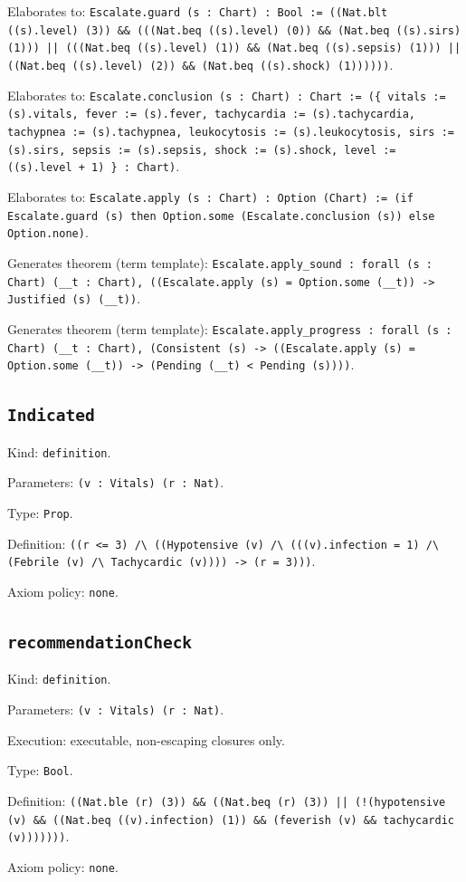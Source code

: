 \documentclass[11pt]{article}
\begin{document}
\noindent Elaborates to: \texttt{Escalate.guard (s : Chart) : Bool := ((Nat.blt ((s).level) (3)) \&\& (((Nat.beq ((s).level) (0)) \&\& (Nat.beq ((s).sirs) (1))) || (((Nat.beq ((s).level) (1)) \&\& (Nat.beq ((s).sepsis) (1))) || ((Nat.beq ((s).level) (2)) \&\& (Nat.beq ((s).shock) (1))))))}.\par
\noindent Elaborates to: \texttt{Escalate.conclusion (s : Chart) : Chart := (\{ vitals := (s).vitals, fever := (s).fever, tachycardia := (s).tachycardia, tachypnea := (s).tachypnea, leukocytosis := (s).leukocytosis, sirs := (s).sirs, sepsis := (s).sepsis, shock := (s).shock, level := ((s).level + 1) \} : Chart)}.\par
\noindent Elaborates to: \texttt{Escalate.apply (s : Chart) : Option (Chart) := (if Escalate.guard (s) then Option.some (Escalate.conclusion (s)) else Option.none)}.\par
\noindent Generates theorem (term template): \texttt{Escalate.apply\_sound : forall (s : Chart) (\_\_t : Chart), ((Escalate.apply (s) = Option.some (\_\_t)) -> Justified (s) (\_\_t))}.\par
\noindent Generates theorem (term template): \texttt{Escalate.apply\_progress : forall (s : Chart) (\_\_t : Chart), (Consistent (s) -> ((Escalate.apply (s) = Option.some (\_\_t)) -> (Pending (\_\_t) < Pending (s))))}.\par
\subsection*{\texttt{Indicated}}
\noindent Kind: \texttt{definition}.\par
\noindent Parameters: \texttt{(v : Vitals) (r : Nat)}.\par
\noindent Type: \texttt{Prop}.\par
\noindent Definition: \texttt{((r <= 3) /\textbackslash{} ((Hypotensive (v) /\textbackslash{} (((v).infection = 1) /\textbackslash{} (Febrile (v) /\textbackslash{} Tachycardic (v)))) -> (r = 3)))}.\par
\noindent Axiom policy: \texttt{none}.\par
\subsection*{\texttt{recommendationCheck}}
\noindent Kind: \texttt{definition}.\par
\noindent Parameters: \texttt{(v : Vitals) (r : Nat)}.\par
\noindent Execution: executable, non-escaping closures only.\par
\noindent Type: \texttt{Bool}.\par
\noindent Definition: \texttt{((Nat.ble (r) (3)) \&\& ((Nat.beq (r) (3)) || (!(hypotensive (v) \&\& ((Nat.beq ((v).infection) (1)) \&\& (feverish (v) \&\& tachycardic (v)))))))}.\par
\noindent Axiom policy: \texttt{none}.\par
\end{document}
